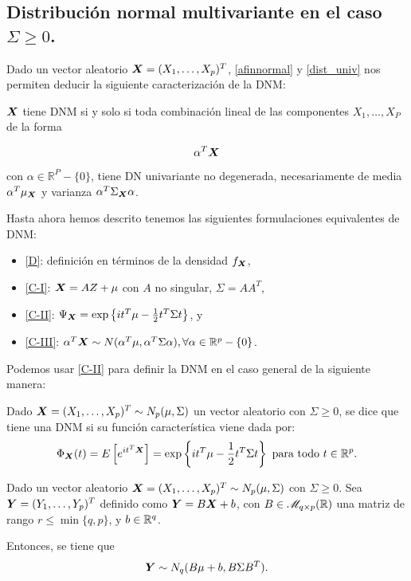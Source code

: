\subsection{Distribución normal multivariante en el caso $\Sigma \ge 0$.}

Dado un vector aleatorio $\boldsymbol{X} = (X_1,\dots,X_p)^T$, \ref{afinnormal} y \ref{dist_univ} nos permiten deducir la siguiente caracterización de la DNM:

\begin{nprop} \label{posvar:car-iii}
  $\boldsymbol{X}$ tiene DNM si y solo si toda combinación lineal de las componentes $X_1,\dots,X_P$ de la forma

  \[
     \alpha^T \boldsymbol{X}
  \]

  con $\alpha\in \mathbb R^P -\{0\}$, tiene DN univariante no degenerada, necesariamente de media $\alpha^T \mu_{\boldsymbol{X}}$
  y varianza $\alpha^T \Sigma_{\boldsymbol{X}} \alpha$.
\end{nprop}


Hasta ahora hemos descrito tenemos las siguientes formulaciones equivalentes de DNM:
\begin{itemize}
\item \hyperref[posvar:defnormal]{[D]}: definición en términos de la densidad $f_{\boldsymbol{X}}$,
\item \hyperref[posvar:car-i]{[C-I]}: $\boldsymbol{X} = AZ + \mu$ con $A$ no singular, $\Sigma = AA^T$,
\item \hyperref[posvar:car-ii]{[C-II]}: $\Psi_{\boldsymbol{X}} = \exp\left\{it^T\mu - \frac{1}{2}t^T \Sigma t\right\}$, y
\item \hyperref[posvar:car-iii]{[C-III]}: $\alpha^T \boldsymbol{X} \sim N(\alpha^T \mu, \alpha^T \Sigma \alpha), \forall \alpha \in \mathbb R^p - \{0\}$.
\end{itemize}


Podemos usar \hyperref[posvar:car-ii]{[C-II]} para definir la DNM en el caso general de la siguiente manera:

\begin{ndef} \label{general:car-ii}
  Dado $\boldsymbol{X} = (X_1,\dots,X_p)^T \sim N_p(\mu,\Sigma)$ un vector aleatorio con $\Sigma \geq 0$, se dice que tiene una DNM si su función característica viene dada por:
  \[
    \Phi_{\boldsymbol{X}}(t) = E\left[e^{it^T \boldsymbol{X}}\right] = \exp\left\{it^T \mu - \frac{1}{2}t^T \Sigma t\right\} \text{ para todo } t \in \mathbb R^p.
  \]

\end{ndef}

\begin{nprop}
  Dado un vector aleatorio $\boldsymbol{X}  = (X_1,\dots,X_p)^T \sim N_p(\mu,\Sigma)$ con $\Sigma \geq 0$. Sea $\boldsymbol{Y} = (Y_1,\dots,Y_p)^T$ definido como $\boldsymbol{Y} = B\boldsymbol{X} + b$, con $B\in \mathscr{M}_{q\times p}(\mathbb{R})$ una matriz de rango $r \leq \min \{q,p\}$, y $b \in \mathbb{R}^q$.

  Entonces, se tiene que
  \[
    \boldsymbol{Y} \sim N_q(B\mu+b, B\Sigma B^T).
  \]
\end{nprop}

